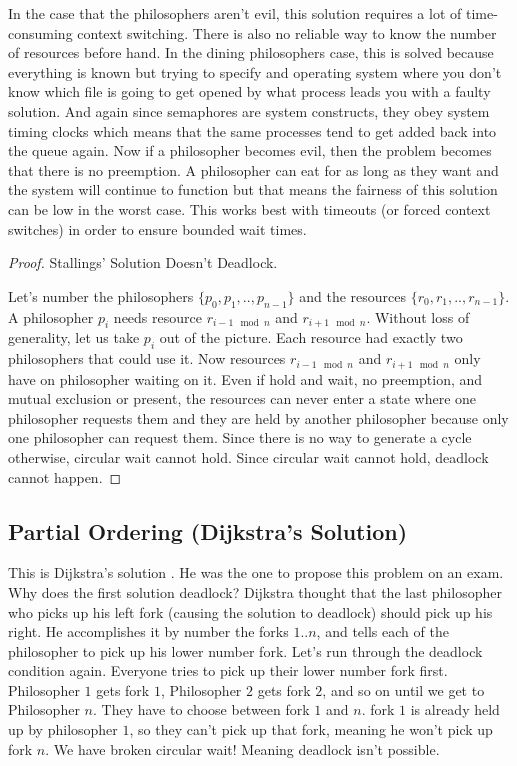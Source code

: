 In the case that the philosophers aren't evil, this solution requires a lot of time-consuming context switching. There is also no reliable way to know the number of resources before hand. In the dining philosophers case, this is solved because everything is known but trying to specify and operating system where you don't know which file is going to get opened by what process leads you with a faulty solution. And again since semaphores are system constructs, they obey system timing clocks which means that the same processes tend to get added back into the queue again. Now if a philosopher becomes evil, then the problem becomes that there is no preemption. A philosopher can eat for as long as they want and the system will continue to function but that means the fairness of this solution can be low in the worst case. This works best with timeouts (or forced context switches) in order to ensure bounded wait times.

\begin{proof} Stallings' Solution Doesn't Deadlock.

Let's number the philosophers $\{p_0, p_1, .., p_{n-1}\}$ and the resources $\{r_0, r_1, .., r_{n-1}\}$. A philosopher $p_i$ needs resource $r_{i-1 \mod n}$ and $r_{i + 1 \mod n}$. Without loss of generality, let us take $p_i$ out of the picture. Each resource had exactly two philosophers that could use it. Now resources $r_{i-1 \mod n}$ and $r_{i + 1 \mod n}$ only have on philosopher waiting on it. Even if hold and wait, no preemption, and mutual exclusion or present, the resources can never enter a state where one philosopher requests them and they are held by another philosopher because only one philosopher can request them. Since there is no way to generate a cycle otherwise, circular wait cannot hold. Since circular wait cannot hold, deadlock cannot happen.

\end{proof}


\subsection{Partial Ordering (Dijkstra's Solution)}

This is Dijkstra's solution \cite[P. 20]{EWD:EWD310}. He was the one to propose this problem on an exam. Why does the first solution deadlock? Dijkstra thought that the last philosopher who picks up his left fork (causing the solution to deadlock) should pick up his right. He accomplishes it by number the forks $1..n$, and tells each of the philosopher to pick up his lower number fork. Let's run through the deadlock condition again. Everyone tries to pick up their lower number fork first. Philosopher $1$ gets fork $1$, Philosopher $2$ gets fork $2$, and so on until we get to Philosopher $n$. They have to choose between fork $1$ and $n$. fork $1$ is already held up by philosopher $1$, so they can't pick up that fork, meaning he won't pick up fork $n$. We have broken circular wait! Meaning deadlock isn't possible.


